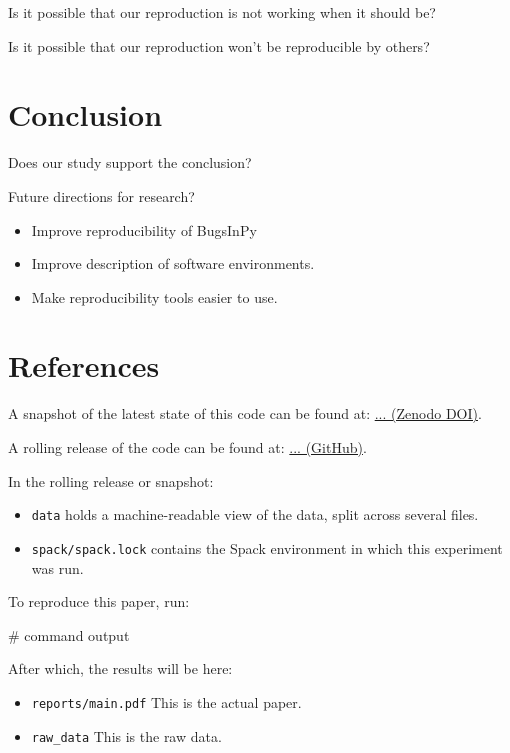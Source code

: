 \documentclass[conference]{IEEEtran}
\begin{document}
Is it possible that our reproduction is not working when it should be?

Is it possible that our reproduction won't be reproducible by others?

\section{Conclusion}

Does our study support the conclusion?

Future directions for research?

\begin{itemize}
\item Improve reproducibility of BugsInPy
\item Improve description of software environments.
\item Make reproducibility tools easier to use.
\end{itemize}

\section*{References}

\printbibliography


A snapshot of the latest state of this code can be found at: \url{... (Zenodo DOI)}.

A rolling release of the code can be found at: \url{... (GitHub)}.

In the rolling release or snapshot:
\begin{itemize}
\item \texttt{data} holds a machine-readable view of the data, split across several files.
\item \texttt{spack/spack.lock} contains the Spack environment in which this experiment was run.
\end{itemize}

To reproduce this paper, run:

\begin{verbatim*}
# command
output
\end{verbatim*}

After which, the results will be here:

\begin{itemize}
\item \texttt{reports/main.pdf} This is the actual paper.
\item \texttt{raw\_data} This is the raw data.
\end{itemize}
\end{document}
